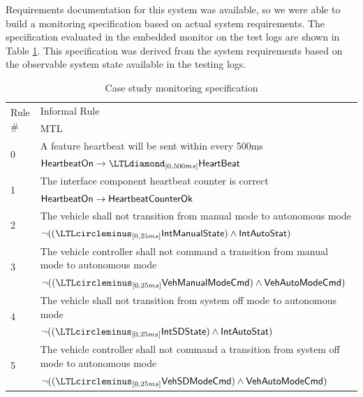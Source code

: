 Requirements documentation for this system was available, so we were able to build a monitoring specification based on actual system requirements.
The specification evaluated in the embedded monitor on the test logs are shown in Table \ref{tab:monspec}. This specification was derived from the system requirements based on the observable system state available in the testing logs. 



\begin{table}[t]
\begin{tabular}{|l|p{4.5in}|}
\hline \multirow{2}{*}{Rule \#} & Informal Rule \\ & MTL \\
\hline \multirow{2}{*}{0} & A feature heartbeat will be sent within every 500ms \\
& $\pred{HeartbeatOn} \rightarrow \LTLdiamond_{[0,500ms]} \pred{HeartBeat}$ \\
\hline \multirow{2}{*}{1} & The interface component heartbeat counter is correct \\
& $\mathsf{HeartbeatOn} \rightarrow \mathsf{HeartbeatCounterOk}$ \\
\hline \multirow{2}{*}{2} & The vehicle shall not transition from manual mode to autonomous mode \\
&  $\neg ((\LTLcircleminus_{[0,25ms]} \pred{IntManualState}) \wedge \pred{IntAutoStat})$\\
\hline \multirow{2}{*}{3} & The vehicle controller shall not command a transition from manual mode to autonomous mode \\
& $\neg ((\LTLcircleminus_{[0,25ms]} \pred{VehManualModeCmd}) \wedge \pred{VehAutoModeCmd})$\\
\hline \multirow{2}{*}{4} & The vehicle shall not transition from system off mode to autonomous mode \\ 
&  $\neg ((\LTLcircleminus_{[0,25ms]} \pred{IntSDState}) \wedge \pred{IntAutoStat})$\\
\hline \multirow{2}{*}{5} & The vehicle controller shall not command a transition from system off mode to autonomous mode \\
& $\neg ((\LTLcircleminus_{[0,25ms]} \pred{VehSDModeCmd}) \wedge \pred{VehAutoModeCmd})$\\
\hline
\end{tabular}
\caption{Case study monitoring specification \label{tab:monspec}}
\end{table}

